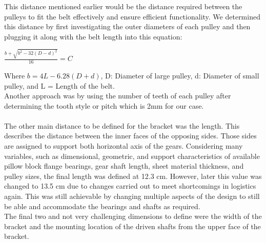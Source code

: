 This distance mentioned earlier would be the distance required between the pulleys to fit the belt effectively and ensure efficient functionality. We determined this distance by first investigating the outer diameters of each pulley and then plugging it along with the belt length into this equation:\\
\begin{center}
    $\frac{b+ \sqrt{b^2-32(D-d)^2} }{16}=C$
\end{center}
Where $b=4L-6.28(D+d)$, D: Diameter of large pulley, d: Diameter of small pulley, and L = Length of the belt.\\
Another approach was by using the number of teeth of each pulley after determining the tooth style or pitch which is 2mm for our case.\\
\\
The other main distance to be defined for the bracket was the length. This describes the distance between the inner faces of the opposing sides. Those sides are assigned to support both horizontal axis of the gears. Considering many variables, such as dimensional, geometric, and support characteristics of available pillow block flange bearings, gear shaft length, sheet material thickness, and pulley sizes, the final length was defined at 12.3 cm. However, later this value was changed to 13.5 cm due to changes carried out to meet shortcomings in logistics again. This was still achievable by changing multiple aspects of the design to still be able and accommodate the bearings and shafts as required. 
\\
The final two and not very challenging dimensions to define were the width of the bracket and the mounting location of the driven shafts from the upper face of the bracket.
\\
